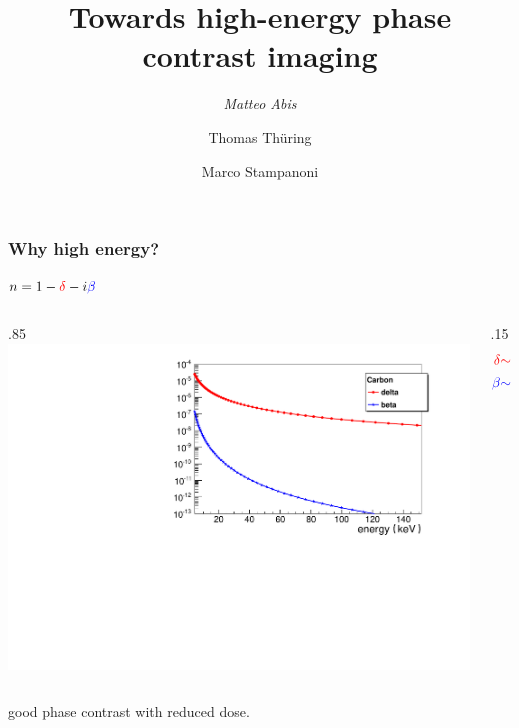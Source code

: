 \documentclass[first,firstsupp]{ETHclass}
\newcommand{\energy}{\mathcal{E}}
\begin{document}
        \title[First progress report]{Towards high-energy phase contrast imaging}
        \author{\emph{Matteo Abis} \and %
        Thomas Th\"uring \and %
        Marco Stampanoni}
    \renewcommand{\today}{15th January 2013}
    \begin{frame}
        \maketitle
    \end{frame}

    \begin{frame}
        \frametitle{Why high energy?}
        $n = 1 - {\color{red}\delta} - i {\color{blue}\beta}$
        \begin{columns}
            \begin{column}
                {.85\textwidth}
                \includegraphics[width=.9\textwidth]{delta_beta_refraction_index_6_1_200}
            \end{column}
            \begin{column}
                {.15\textwidth}
                \begin{align*}
                    {\color{red}\delta} &{\color{red}\sim \energy^{-2}}\\
                    {\color{blue}\beta} &{\color{blue}\sim \energy^{-4}}
                \end{align*}
            \end{column}
        \end{columns}
        \begin{figure}[h]
            \centering
        \end{figure}
        good phase contrast with reduced dose.
    \end{frame}
\end{document}
